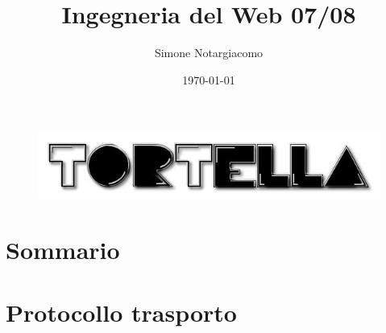 \documentclass[a4paper,italian,12pt]{beamer}
\title{Ingegneria del Web 07/08}
\institute{Università di Roma Tor Vergata}
\author{Simone Notargiacomo}
\date{\today}
\begin{document}
	\begin{frame}
		\titlepage
		\begin{figure}[H]
			\begin{center}
				\includegraphics[scale=0.4]{etc/tortellalogo.jpg}
			\end{center}
		\end{figure}
	\end{frame}

    \section{Sommario}
	    \frame{\tableofcontents}

	\section{Protocollo trasporto}
\end{document}
